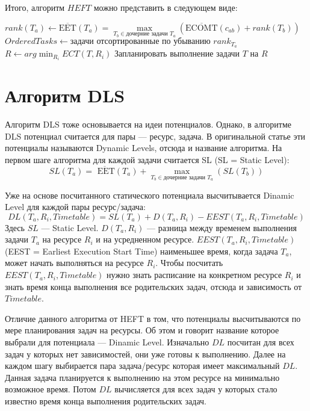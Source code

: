 \begin{spacing}{1.5}
Итого, алгоритм $HEFT$ можно представить в следующем виде:


\begin{algorithmic}
\STATE $rank(T_a) \leftarrow \overline{\mbox{EET}}(T_a) = \max\limits_{T_b \in \text{дочерние задачи $T_a$}}(\overline{\mbox{ECOMT}} (c_{ab}) + rank (T_b))$
\ENDFOR
\STATE $OrderedTasks \leftarrow \text{задачи отсортированные по убыванию $rank_{T_a}$}$
\STATE $R \leftarrow arg\min_{R_i} ECT(T, R_i)$
\STATE Запланировать выполнение задачи $T$ на $R$
\ENDFOR
\end{algorithmic}

\newpage
\section*{Алгоритм DLS}

Алгоритм DLS тоже основывается на идеи потенциалов. Однако, в алгоритме DLS потенциал считается для пары --- ресурс, задача. В оригинальной статье эти потенциалы называются Dynamic Levels, отсюда и название алгоритма. На первом шаге алгоритма для каждой задачи считается SL (SL = Static Level):
$$
SL(T_a) = \overline{\mbox{ EET}}(T_a) + \max_{T_b \in \text{дочерние задачи $T_a$}}(SL (T_b))
$$

Уже на основе посчитанного статического потенциала высчитывается Dinamic Level для каждой пары ресурс/задача:
$$
DL(T_a, R_i, Timetable) = SL(T_a) + D(T_a, R_i) - EEST(T_a, R_i, Timetable)
$$
Здесь $SL$ --- Static Level. $D(T_a, R_i)$ --- разница между временем выполнения задачи $T_a$ на ресурсе $R_i$ и на усредненном ресурсе. $EEST(T_a, R_i, Timetable)$ (EEST = Earliest Execution Start Time) наименьшее время, когда задача $T_a$, может начать выполняться на ресурсе $R_i$. Чтобы посчитать $EEST(T_a, R_i, Timetable)$ нужно знать расписание на конкретном ресурсе $R_i$ и знать время конца выполнения все родительских задач, отсюда и зависимость от $Timetable$. 

Отличие данного алгоритма от HEFT в том, что потенциалы высчитываются по мере планирования задач на ресурсы. Об этом и говорит название которое выбрали для потенциала --- Dinamic Level. Изначально $DL$ посчитан для всех задач у которых нет зависимостей, они уже готовы к выполнению. Далее на каждом шагу выбирается пара задача/ресурс которая имеет максимальный $DL$. Данная задача планируется к выполнению на этом ресурсе на минимально возможное время. Потом $DL$ вычисляется для всех задач у которых стало известно время конца выполнения родительских задач.


\end{spacing}
